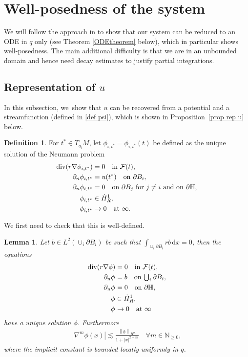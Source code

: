\documentclass[JEP,XML,SOM,Unicode,published]{cedram}
\let\ts\textstyle
\newtheorem{lemma}[theorem]{Lemma}
\theoremstyle{definition}
\newtheorem{definition}[theorem]{Definition}
\renewcommand{\div}{\operatorname{div}}
\newcommand\N{\mathbb{N}}
\newcommand\norm[1]{\left\lVert #1\right\rVert}
\newcommand\eq{=}
\newcommand\dd{\,\mathrm{d}}
\newcommand\dx{\dd x}
\let\de\partial
\begin{document}
\section{Well-posedness of the system}\label{Section2}
We will follow the approach in \cite{GlassMunnierSueur2} to show that our system can be reduced to an ODE in $q$ only (see Theorem \ref{ODEtheorem} below), which in particular shows well-posedness. The main additional difficulty is that we are in an unbounded domain and hence need decay estimates to justify partial integrations.

\subsection{Representation of $u$}\label{repU}
In this subsection, we~show that $u$ can be recovered from a potential and a streamfunction (defined in \ref{def psi}), which is shown in Proposition~\ref{prop rep u} below.

\begin{definition}
For $t^*\in T_{q_i}M$, let $\phi_{i,t^*}=\phi_{i,t^*}(t)$ be defined as the unique solution of the Neumann problem
\begin{align*}
\div(r\nabla\phi_{i,t^*})&\eq0 \quad\text{\normalfont{in} $\mathcal{F}(t)$},\\
\de_n\phi_{i,t^*}&\eq u(t^*) \quad\text{\normalfont{on} $\de B_i$},\\
\de_n\phi_{i,t^*}&\eq 0 \quad\text{\normalfont{on} $\de B_j$ \normalfont{for} $j\neq i$ \normalfont{and on} $\de\mathbb{H}$},\\
\phi_{i,t^*}&\in \dot{H}_R^1,\\
\phi_{i,t^*}&\to 0\quad\text{at $\infty$}.
\end{align*}
\end{definition}

We first need to check that this is well-defined.

\begin{lemma}\label{ExistencePhi}
Let $b\in L^2(\cup_i \de B_i)$ be such that $\int_{\cup_i\de B_i}rb\dx=0$, then the equations
\begin{align*}
\div(r\nabla\phi)&\eq0 \quad\text{\normalfont{in} $\mathcal{F}(t)$},\\
\de_n\phi_{}&\eq b \quad\text{\normalfont{on} $\ts\bigcup_i \de B_i$},\\
\de_n\phi_{}&\eq 0 \quad\text{\normalfont{on} $\de\mathbb{H}$},\\
\phi_{}&\in \dot{H}_R^1,\\
\phi_{}&\to 0\quad\text{at $\infty$}
\end{align*}
have a unique solution $\phi$. Furthermore
\begin{align}\label{decayphi}
|\nabla^m\phi(x)|\lesssim \frac{\norm{b}_{H^{m}}}{1+|x|^{2+m}} \quad\forall m\in\N_{\geq 0},
\end{align}
where the implicit constant is bounded locally uniformly in $q$.

\end{lemma}
\end{document}
